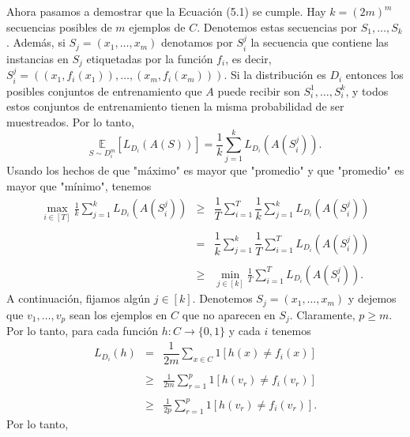 \begin{teo}
Ahora pasamos a demostrar que la Ecuación (5.1) se cumple. Hay $k = (2m)^m$ secuencias posibles de $m$ ejemplos de $C$. Denotemos estas secuencias por $S_1, \ldots, S_k$. Además, si $S_j = (x_1, \ldots, x_m)$ denotamos por $S_i^j$ la secuencia que contiene las instancias en $S_j$ etiquetadas por la función $f_i$, es decir, $S_i^j = ((x_1, f_i(x_1)), \ldots ,(x_m, f_i(x_m)))$. Si la distribución es $D_i$ entonces los posibles conjuntos de entrenamiento que $A$ puede recibir son $S_i^1, \ldots, S_i^k$, y todos estos conjuntos de entrenamiento tienen la misma probabilidad de ser muestreados. Por lo tanto,
\begin{equation}
    \underset{S \sim D_i^m}{\mathbb{E}}[L_{D_i}(A(S))] = \dfrac{1}{k} \sum_{j=1}^{k} L_{D_i}(A(S_i^j)).
\end{equation}
Usando los hechos de que "máximo" es mayor que "promedio" y que "promedio" es mayor que "mínimo", tenemos
\begin{equation}
    \begin{array}{rcl}
	\displaystyle\max_{i \in [T]} \frac{1}{k} \sum_{j=1}^{k} L_{D_i}(A(S_i^j)) & \geq & \displaystyle\dfrac{1}{T} \sum_{i=1}^{T} \dfrac{1}{k} \sum_{j=1}^{k} L_{D_i}(A(S_i^j))\\\\
										   &=& \displaystyle\dfrac{1}{k} \sum_{j=1}^{k} \dfrac{1}{T} \sum_{i=1}^{T} L_{D_i}(A(S_i^j))\\\\
										   &\geq& \displaystyle\min_{j \in [k]} \frac{1}{T} \sum_{i=1}^{T} L_{D_i}(A(S_i^j)).
    \end{array}
\end{equation}
A continuación, fijamos algún $j \in [k]$. Denotemos $S_j = (x_1, \ldots, x_m)$ y dejemos que $v_1, \ldots, v_p$ sean los ejemplos en $C$ que no aparecen en $S_j$. Claramente, $p \geq m$. Por lo tanto, para cada función $h : C \rightarrow \{0, 1\}$ y cada $i$ tenemos
\begin{equation}
    \begin{array}{rcl}
	L_{D_i}(h) &=& \displaystyle\dfrac{1}{2m} \sum_{x \in C} 1[h(x) \neq f_i(x)]\\\\
		   &\geq & \frac{1}{2m} \sum_{r=1}^{p} 1[h(v_r) \neq f_i(v_r)]\\\\
		   &\geq & \frac{1}{2p} \sum_{r=1}^{p} 1[h(v_r) \neq f_i(v_r)]. 
    \end{array}
\end{equation}
Por lo tanto,
\begin{equation}

\end{equation}
\end{teo}

